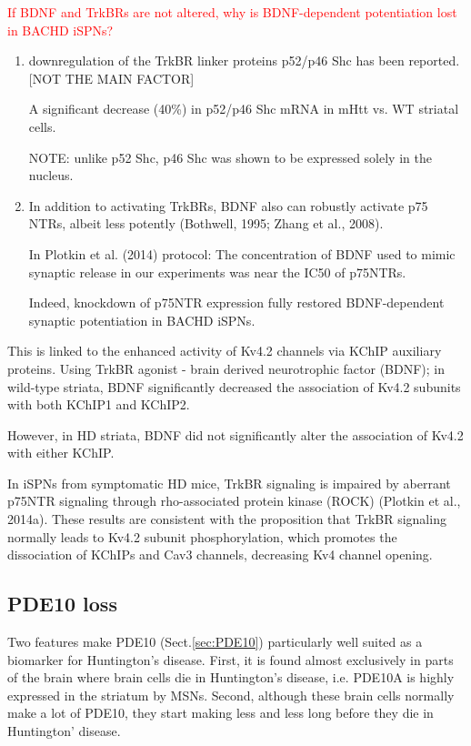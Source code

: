 \textcolor{red}{If BDNF and TrkBRs are not altered, why is BDNF-dependent
potentiation lost in BACHD iSPNs?}
\begin{enumerate}
  \item downregulation of the TrkBR linker proteins p52/p46 Shc has been
  reported. [NOT THE MAIN FACTOR]

  A significant decrease (40\%) in p52/p46 Shc mRNA in mHtt vs. WT
  striatal cells. 
  
  NOTE: unlike p52 Shc, p46 Shc was shown to be expressed solely in the nucleus. 
  
  
  \item In addition to activating TrkBRs, BDNF also can robustly activate p75
  NTRs, albeit less potently (Bothwell, 1995; Zhang et al., 2008).
  
  In Plotkin et al. (2014) protocol: The concentration of BDNF used to
mimic synaptic release in our experiments was near the IC50
of p75NTRs.

Indeed, knockdown of p75NTR expression fully restored
BDNF-dependent synaptic potentiation in BACHD iSPNs. 
\end{enumerate}


This is linked to the enhanced activity of Kv4.2 channels via KChIP auxiliary
proteins. Using TrkBR agonist - brain derived neurotrophic factor (BDNF); in
wild-type striata, BDNF significantly decreased the association of Kv4.2
subunits with both KChIP1 and KChIP2.

However, in HD striata, BDNF did not significantly alter the association of
Kv4.2 with either KChIP.

In iSPNs from symptomatic HD mice, TrkBR signaling is impaired by aberrant
p75NTR signaling through rho-associated protein kinase (ROCK) (Plotkin et al.,
2014a). These results are consistent with the proposition that TrkBR signaling
normally leads to Kv4.2 subunit phosphorylation, which promotes the dissociation
of KChIPs and Cav3 channels, decreasing Kv4 channel opening.

\subsection{PDE10 loss}
\label{sec:HD-role-of-PDE10-loss}

Two features make PDE10 (Sect.\ref{sec:PDE10}) particularly well suited as a
biomarker for Huntington's disease. First, it is found almost exclusively in
parts of the brain where brain cells die in Huntington's disease, i.e. PDE10A is
highly expressed in the striatum by MSNs. Second, although these brain cells
normally make a lot of PDE10, they start making less and less long before they
die in Huntington' disease.

